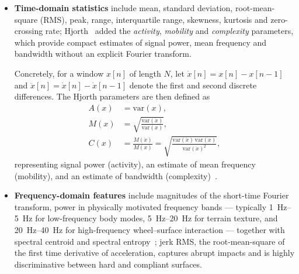 \begin{itemize}
    \item \textbf{Time-domain statistics} include mean, standard deviation, root-mean-square (RMS), peak, range, interquartile range, skewness, kurtosis and zero-crossing rate; Hjorth~\cite{Hjorth1970} added the \emph{activity}, \emph{mobility} and \emph{complexity} parameters, which provide compact estimates of signal power, mean frequency and bandwidth without an explicit Fourier transform. 
    
    Concretely, for a window $x[n]$ of length $N$, let $\dot{x}[n] = x[n]-x[n-1]$ and $\ddot{x}[n] = \dot{x}[n]-\dot{x}[n-1]$ denote the first and second discrete differences. The Hjorth parameters are then defined as
    \begin{align}
    A(x) &= \mathrm{var}(x), \label{eq:hjorth-activity} \\
    M(x) &= \sqrt{\frac{\mathrm{var}(\dot{x})}{\mathrm{var}(x)}}, \label{eq:hjorth-mobility} \\
    C(x) &= \frac{M(\dot{x})}{M(x)}
          = \sqrt{\frac{\mathrm{var}(\ddot{x})\,\mathrm{var}(x)}{\mathrm{var}(\dot{x})^{2}}},
          \label{eq:hjorth-complexity}
    \end{align}
    representing signal power (activity), an estimate of mean frequency (mobility), and an estimate of bandwidth (complexity)~\cite{Hjorth1970}.

    \item \textbf{Frequency-domain features} include magnitudes of the short-time Fourier transform, power in physically motivated frequency bands --- typically \SIrange{1}{5}{\hertz} for low-frequency body modes, \SIrange{5}{20}{\hertz} for terrain texture, and \SIrange{20}{40}{\hertz} for high-frequency wheel--surface interaction --- together with spectral centroid and spectral entropy~\cite{Welch1967,Brooks2005}; jerk RMS, the root-mean-square of the first time derivative of acceleration, captures abrupt impacts and is highly discriminative between hard and compliant surfaces. 


\end{itemize}
